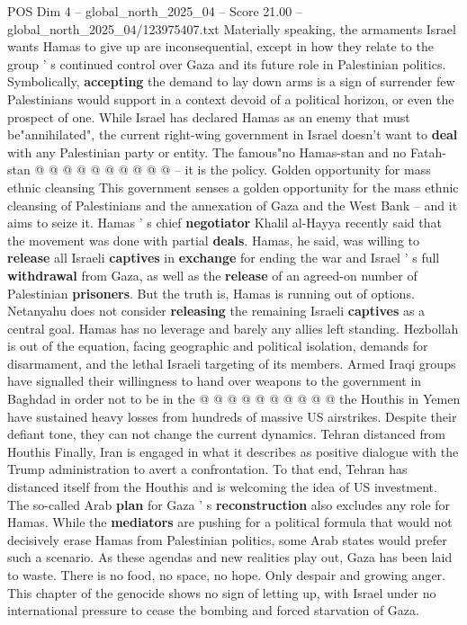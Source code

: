 \begin{textsample}{POS Dim 4 – global\_north\_2025\_04 – Score 21.00 – global\_north\_2025\_04/123975407.txt}
Materially speaking, the armaments Israel wants Hamas to give up are inconsequential, except in how they relate to the group ' s continued control over Gaza and its future role in Palestinian politics.
Symbolically, \textbf{accepting} the demand to lay down arms is a sign of surrender few Palestinians would support in a context devoid of a political horizon, or even the prospect of one.
While Israel has declared Hamas as an enemy that must be"annihilated", the current right-wing government in Israel doesn't want to \textbf{deal} with any Palestinian party or entity.
The famous"no Hamas-stan and no Fatah-stan @ @ @ @ @ @ @ @ @ @ -- it is the policy.
Golden opportunity for mass ethnic cleansing This government senses a golden opportunity for the mass ethnic cleansing of Palestinians and the annexation of Gaza and the West Bank -- and it aims to seize it.
Hamas ' s chief \textbf{negotiator} Khalil al-Hayya recently said that the movement was done with partial \textbf{deals}.
Hamas, he said, was willing to \textbf{release} all Israeli \textbf{captives} in \textbf{exchange} for ending the war and Israel ' s full \textbf{withdrawal} from Gaza, as well as the \textbf{release} of an agreed-on number of Palestinian \textbf{prisoners}.
But the truth is, Hamas is running out of options.
Netanyahu does not consider \textbf{releasing} the remaining Israeli \textbf{captives} as a central goal.
Hamas has no leverage and barely any allies left standing.
Hezbollah is out of the equation, facing geographic and political isolation, demands for disarmament, and the lethal Israeli targeting of its members.
Armed Iraqi groups have signalled their willingness to hand over weapons to the government in Baghdad in order not to be in the @ @ @ @ @ @ @ @ @ @ the Houthis in Yemen have sustained heavy losses from hundreds of massive US airstrikes.
Despite their defiant tone, they can not change the current dynamics.
Tehran distanced from Houthis Finally, Iran is engaged in what it describes as positive dialogue with the Trump administration to avert a confrontation.
To that end, Tehran has distanced itself from the Houthis and is welcoming the idea of US investment.
The so-called Arab \textbf{plan} for Gaza ' s \textbf{reconstruction} also excludes any role for Hamas.
While the \textbf{mediators} are pushing for a political formula that would not decisively erase Hamas from Palestinian politics, some Arab states would prefer such a scenario.
As these agendas and new realities play out, Gaza has been laid to waste.
There is no food, no space, no hope.
Only despair and growing anger.
This chapter of the genocide shows no sign of letting up, with Israel under no international pressure to cease the bombing and forced starvation of Gaza.

\end{textsample}
